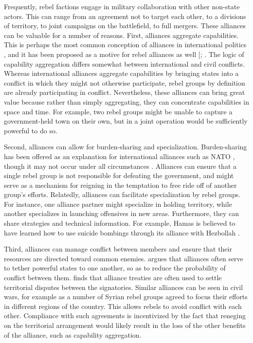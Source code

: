 \documentclass[12pt,]{book}
\begin{document}
Frequently, rebel factions engage in military collaboration with other
non-state actors. This can range from an agreement not to target each
other, to a divisions of territory, to joint campaigns on the
battlefield, to full mergers. These alliances can be valuable for a
number of reasons. First, alliances aggregate capabilities. This is
perhaps the most common conception of alliances in international
politics \citep[see][]{Bennett1997}, and it has been proposed as a
motive for rebel alliances as well {[}\citet{Bapat2012};
\citet{Horowitz2013}. The logic of capability aggregation differs
somewhat between international and civil conflicts. Whereas
international alliances aggregate capabilities by bringing states into a
conflict in which they might not otherwise participate, rebel groups by
definition are already participating in conflict. Nevertheless, these
alliances can bring great value because rather than simply aggregating,
they can concentrate capabilities in space and time. For example, two
rebel groups might be unable to capture a government-held town on their
own, but in a joint operation would be sufficiently powerful to do so.

Second, alliances can allow for burden-sharing and specialization.
Burden-sharing has been offered as an explanation for international
alliances such as NATO \citep{Sandler1980}, though it may not occur
under all circumstances \citep[see][]{Olson1966}. Alliances can ensure
that a single rebel group is not responsible for defeating the
government, and might serve as a mechanism for reigning in the
temptation to free ride off of another group's efforts. Relatedly,
alliances can facilitate specialization by rebel groups. For instance,
one alliance partner might specialize in holding territory, while
another specializes in launching offensives in new areas. Furthermore,
they can share strategies and technical information. For example, Hamas
is believed to have learned how to use suicide bombings through its
alliance with Hezbollah \citep{Horowitz2013}.

Third, alliances can manage conflict between members and ensure that
their resources are directed toward common enemies. \citet{Weitsman1997}
argues that alliances often serve to tether powerful states to one
another, so as to reduce the probability of conflict between them.
\citet{Gibler1996} finds that alliance treaties are often used to settle
territorial disputes between the signatories. Similar alliances can be
seen in civil wars, for example as a number of Syrian rebel groups
agreed to focus their efforts in different regions of the country. This
allows rebels to avoid conflict with each other. Compliance with such
agreements is incentivized by the fact that reneging on the territorial
arrangement would likely result in the loss of the other benefits of the
alliance, such as capability aggregation.
\end{document}
